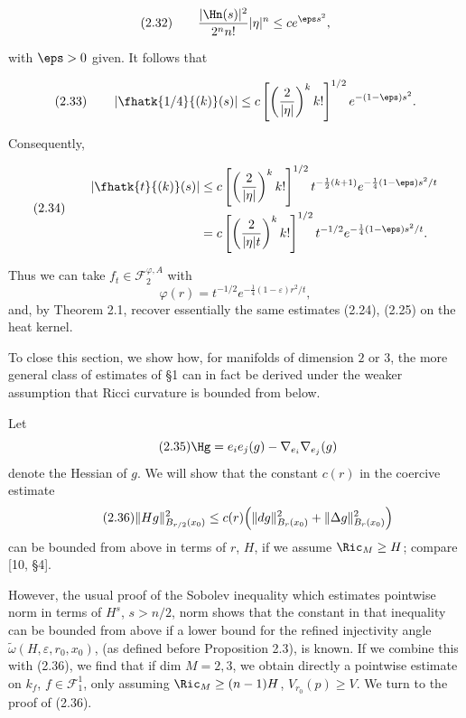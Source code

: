 \begin{example}
\begin{equation*}
(2.32)\qquad \frac{|\Hn(s)|^2}{2^n n!}|\eta|^n \le c e^{\eps s^2},
\end{equation*}

with $\eps>0$ given. It follows that

\begin{equation*}
(2.33)\qquad \left|\fhatk{1/4}{(k)}(s)\right|\le c\left[\left(\frac{2}{|\eta|}\right)^k k!\right]^{1/2}e^{-(1-\eps)s^2}.
\end{equation*}

Consequently,

\begin{equation*}
(2.34)\qquad
\begin{aligned}
\left|\fhatk{t}{(k)}(s)\right|
&\le c\left[\left(\frac{2}{|\eta|}\right)^k k!\right]^{1/2}t^{-\frac12(k+1)}e^{-\frac14(1-\eps)s^2/t}\\
&= c\left[\left(\frac{2}{|\eta|t}\right)^k k!\right]^{1/2}t^{-1/2}e^{-\frac14(1-\eps)s^2/t}.
\end{aligned}
\end{equation*}

Thus we can take $f_t \in \mathscr{F}_2^{\varphi,A}$ with
\[
\varphi(r)=t^{-1/2}e^{-\frac14(1-\varepsilon)r^2/t},
\]
and, by Theorem 2.1, recover essentially the same estimates (2.24), (2.25) on the heat kernel.
\end{example}

To close this section, we show how, for manifolds of dimension $2$ or $3$, the more general class of estimates of \S1 can in fact be derived under the weaker assumption that Ricci curvature is bounded from below.

Let
\begin{equation}\tag{2.35}
\Hg=e_i e_j(g)-\nabla_{e_i}\nabla_{e_j}(g)
\end{equation}
denote the Hessian of $g$. We will show that the constant $c(r)$ in the coercive estimate
\begin{equation}\tag{2.36}
\|Hg\|_{B_{r/2}(x_0)}^{2}\le c(r)\Bigl(\|dg\|_{B_r(x_0)}^{2}+\|\Delta g\|_{B_r(x_0)}^{2}\Bigr)
\end{equation}
can be bounded from above in terms of $r$, $H$, if we assume $\Ric_M\ge H$; compare [10, \S4].

However, the usual proof of the Sobolev inequality which estimates pointwise norm in terms of $H^s$, $s>n/2$, norm shows that the constant in that inequality can be bounded from above if a lower bound for the refined injectivity angle $\widetilde{\omega}(H,\varepsilon,r_0,x_0)$, (as defined before Proposition 2.3), is known.
If we combine this with (2.36), we find that if dim $M=2,3$, we obtain directly a pointwise estimate on $k_f$, $f\in \mathscr{F}_1^{1}$, only assuming $\Ric_M\ge (n-1)H$, $V_{r_0}(p)\ge V$. We turn to the proof of (2.36).


